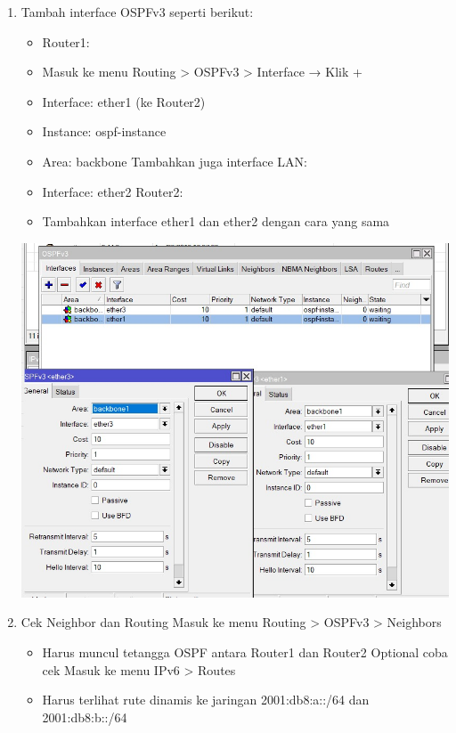 \begin{enumerate}
\begin{enumerate}
        \item Tambah interface OSPFv3 seperti berikut:
        \begin{itemize}
            \item Router1:
            \item Masuk ke menu Routing > OSPFv3 > Interface → Klik +
            \item Interface: ether1 (ke Router2)
            \item Instance: ospf-instance
            \item Area: backbone Tambahkan juga interface LAN:
            \item Interface: ether2 Router2:
            \item Tambahkan interface ether1 dan ether2 dengan cara yang sama
        \end{itemize}

        \includegraphics[scale=0.5]{P1/img/15.jpg}

        \item Cek Neighbor dan Routing Masuk ke menu Routing > OSPFv3 > Neighbors
        \begin{itemize}
            \item Harus muncul tetangga OSPF antara Router1 dan Router2 Optional coba cek Masuk ke menu IPv6 > Routes
            \item Harus terlihat rute dinamis ke jaringan 2001:db8:a::/64 dan 2001:db8:b::/64
        \end{itemize}


\end{enumerate}
\end{enumerate}
